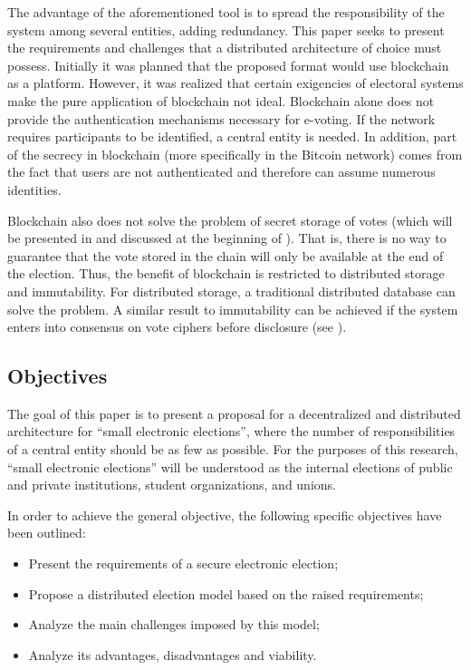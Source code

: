 \documentclass[english]{textolivre}
\begin{document}
The advantage of the aforementioned tool is to spread the responsibility of the system among several entities, adding redundancy. This paper seeks to present the requirements and challenges that a distributed architecture of choice must possess. Initially it was planned that the proposed format would use blockchain as a platform. However, it was realized that certain exigencies of electoral systems make the pure application of blockchain not ideal. Blockchain alone does not provide the authentication mechanisms necessary for e-voting. If the network requires participants to be identified, a central entity is needed. In addition, part of the secrecy in blockchain (more specifically in the Bitcoin network) comes from the fact that users are not authenticated and therefore can assume numerous identities.

Blockchain also does not solve the problem of secret storage of votes (which will be presented in  and discussed at the beginning of ). That is, there is no way to guarantee that the vote stored in the chain will only be available at the end of the election. Thus, the benefit of blockchain is restricted to distributed storage and immutability. For distributed storage, a traditional distributed database can solve the problem. A similar result to immutability can be achieved if the system enters into consensus on vote ciphers before disclosure (see ).

\subsection{Objectives \label{sec-objectives}}

The goal of this paper is to present a proposal for a decentralized and distributed architecture for “small electronic elections”, where the number of responsibilities of a central entity should be as few as possible. For the purposes of this research, “small electronic elections” will be understood as the internal elections of public and private institutions, student organizations, and unions.

In order to achieve the general objective, the following specific objectives have been
outlined:

\begin{itemize}
\item Present the requirements of a secure electronic election;
\item Propose a distributed election model based on the raised requirements;
\item Analyze the main challenges imposed by this model;
\item Analyze its advantages, disadvantages and viability.
\end{itemize}
\end{document}
